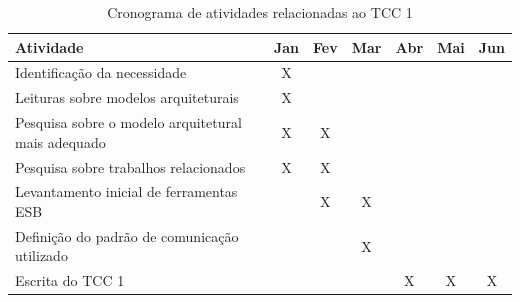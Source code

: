 \begin{table}[!h]
\centering
\caption{Cronograma de atividades relacionadas ao TCC 1}
\label{cronograma_tcc1}
\begin{tabular}{|p{9cm}|c|c|c|c|c|c|}
\hline
Atividade                                                   & \multicolumn{1}{l|}{Jan} & \multicolumn{1}{l|}{Fev} & \multicolumn{1}{l|}{Mar} & \multicolumn{1}{l|}{Abr} & \multicolumn{1}{l|}{Mai} & \multicolumn{1}{l|}{Jun} \\ \hline
Identificação da necessidade                                & X                           &                             &                              &                            &                             &                              \\ \hline
Leituras sobre modelos arquiteturais                        & X                           &                             &                              &                            &                             &                              \\ \hline
Pesquisa sobre o modelo arquitetural mais adequado          & X                           & X                             &                              &                            &                             &                              \\ \hline
Pesquisa sobre trabalhos relacionados                       & X                           & X                        &                              &                            &                             &                              \\ \hline
Levantamento inicial de ferramentas ESB                    &                             & X                        & X                            &                            &                             &                              \\ \hline
Definição do padrão de comunicação utilizado                &                             &                          & X                            &                            &                             &                              \\ \hline
Escrita do TCC 1                                            &                             &                             &                              & X                           & X                           & X          \\ \hline
\end{tabular}
\end{table}
